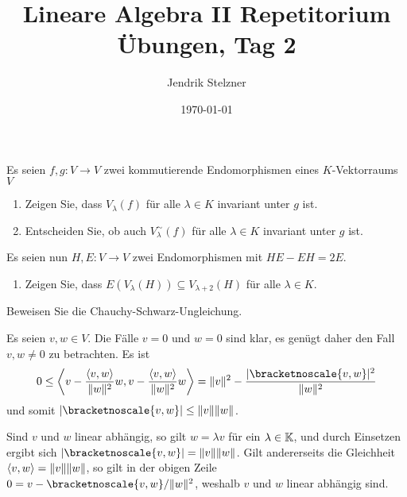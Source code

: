 \documentclass[a4paper, 10pt]{scrartcl}
\title{Lineare Algebra II Repetitorium \\ Übungen, Tag 2}
\author{Jendrik Stelzner}
\date{\today}
\begin{document}
\maketitle


\begin{question}
  Es seien $f, g \colon V \to V$ zwei kommutierende Endomorphismen eines $K$-Vektorraums $V$
  \begin{enumerate}[leftmargin=*]
    \item
      Zeigen Sie, dass $V_\lambda(f)$ für alle $\lambda \in K$ invariant unter $g$ ist.
    \item
      Entscheiden Sie, ob auch $V^\sim_\lambda(f)$ für alle $\lambda \in K$ invariant unter $g$ ist.
  \end{enumerate}
  Es seien nun $H, E \colon V \to V$ zwei Endomorphismen mit $HE - EH = 2E$.
  \begin{enumerate}[leftmargin=*, resume]
    \item
      Zeigen Sie, dass $E(V_\lambda(H)) \subseteq V_{\lambda + 2}(H)$ für alle $\lambda \in K$.
  \end{enumerate}
\end{question}




\begin{question}
  Beweisen Sie die Chauchy-Schwarz-Ungleichung.
\end{question}


\begin{solution}
  Es seien $v, w \in V$.
  Die Fälle $v = 0$ und $w = 0$ sind klar, es genügt daher den Fall $v, w \neq 0$ zu betrachten.
  Es ist
  \[
          0
    \leq  \bracket{ v - \frac{\bracket{v,w}}{\|w\|^2} w, v - \frac{\bracket{v,w}}{\|w\|^2} w}
    =     \|v\|^2 - \frac{|\bracketnoscale{v,w}|^2}{\|w\|^2}
  \]
  und somit $|\bracketnoscale{v,w}| \leq \|v\| \|w\|$.
  
  Sind $v$ und $w$ linear abhängig, so gilt $w = \lambda v$ für ein $\lambda \in \mathbb{K}$, und durch Einsetzen ergibt sich $|\bracketnoscale{v,w}| = \|v\| \|w\|$.
  Gilt andererseits die Gleichheit $\left\langle v,w \right\rangle = \|v\| \|w\|$, so gilt in der obigen Zeile $0 = v - \bracketnoscale{v,w}/\|w\|^2$, weshalb $v$ und $w$ linear abhängig sind.
\end{solution}
\end{document}
